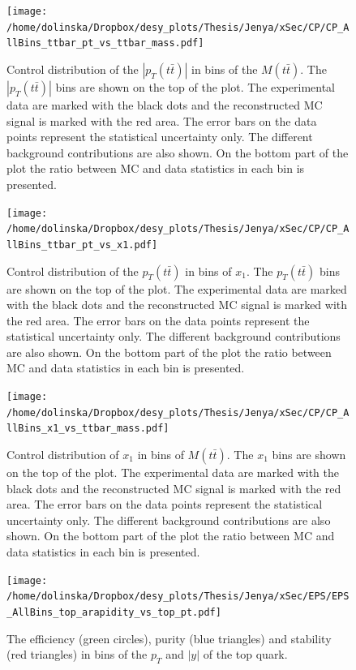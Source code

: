 \begin{figure}[p]
  \centering
  \texttt{[image: /home/dolinska/Dropbox/desy\_plots/Thesis/Jenya/xSec/CP/CP\_AllBins\_ttbar\_pt\_vs\_ttbar\_mass.pdf]}
  \caption{Control distribution of the $|p_{T}(t\bar{t})|$ in bins of the $M(t\bar{t})$. The $|p_{T}(t\bar{t})|$ bins are shown on the top 
  of the plot. The experimental data are marked with the black dots and the reconstructed MC signal is marked with the red area. The error
  bars on the data points represent the statistical uncertainty only. The 
  different background contributions are also shown. On the bottom part of the plot the ratio between MC and data statistics in each bin
  is presented.}
  \label{fig:CP_2D_pttt_Mtt}
\end{figure}

\begin{figure}[p]
  \centering
  \texttt{[image: /home/dolinska/Dropbox/desy\_plots/Thesis/Jenya/xSec/CP/CP\_AllBins\_ttbar\_pt\_vs\_x1.pdf]}
  \caption{Control distribution of the $p_{T}(t\bar{t})$ in bins of $x_{1}$. The $p_{T}(t\bar{t})$ bins are shown on the top 
  of the plot. The experimental data are marked with the black dots and the reconstructed MC signal is marked with the red area. The error
  bars on the data points represent the statistical uncertainty only. The 
  different background contributions are also shown. On the bottom part of the plot the ratio between MC and data statistics in each bin
  is presented.}
  \label{fig:CP_2D_pttt_x1}
\end{figure}

\begin{figure}[p]
  \centering
  \texttt{[image: /home/dolinska/Dropbox/desy\_plots/Thesis/Jenya/xSec/CP/CP\_AllBins\_x1\_vs\_ttbar\_mass.pdf]}
  \caption{Control distribution of $x_{1}$ in bins of $M(t\bar{t})$. The $x_{1}$ bins are shown on the top 
  of the plot. The experimental data are marked with the black dots and the reconstructed MC signal is marked with the red area. The error
  bars on the data points represent the statistical uncertainty only. The 
  different background contributions are also shown. On the bottom part of the plot the ratio between MC and data statistics in each bin
  is presented.}
  \label{fig:CP_2D_Mtt_x1}
\end{figure}



\begin{figure}[p]
  \centering
  \texttt{[image: /home/dolinska/Dropbox/desy\_plots/Thesis/Jenya/xSec/EPS/EPS\_AllBins\_top\_arapidity\_vs\_top\_pt.pdf]}
  \caption{The efficiency (green circles), purity (blue triangles) and stability (red triangles) in bins of the $p_{T}$ and $|y|$ of the top quark.}
  \label{fig:EPS_2D_y_pt}
\end{figure}

